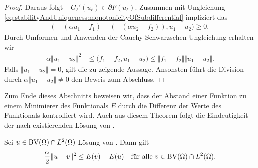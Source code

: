 \begin{proof}
  Daraus folgt
  $-G_\ell'(u_\ell)\in\partial F(u_\ell)$.
  Zusammen mit Ungleichung
  \eqref{eq:stabilityAndUniqueness:monotonicityOfSubdifferential}
  impliziert das
  \begin{align*}
    \big( -(\alpha u_1 - f_1) -(- (\alpha u_2 - f_2)), u_1 - u_2\big)
    \geq 0.
  \end{align*}
  Durch Umformen und Anwenden der Cauchy-Schwarzschen Ungleichung erhalten wir
  \begin{align*}
    \alpha \Vert u_1 - u_2 \Vert^2
    &\leq
    \big(f_1 -f_2, u_1-u_2 \big)
    \leq
    \Vert f_1-f_2\Vert\Vert u_1 - u_2\Vert.
  \end{align*}
  Falls $\Vert u_1 - u_2 \Vert = 0$, gilt die zu zeigende Aussage.
  Ansonsten führt die Division durch $\alpha\Vert u_1 - u_2 \Vert\neq 0$ den
  Beweis zum Abschluss.
\end{proof}

Zum Ende dieses Abschnitts beweisen wir, dass der Abstand einer Funktion
zu einem Minimierer des Funktionals $E$ durch die Differenz der Werte des
Funktionals kontrolliert wird.
Auch aus diesem Theorem folgt die Eindeutigkeit der nach
 existierenden Lösung von
.

\begin{theorem}
  \label{thm:convexity}
  Sei $u\in\textup{BV}(\Omega)\cap L^2(\Omega)$ Lösung von 
  .
  Dann gilt 
  \begin{align*}
    \frac{\alpha}{2}\Vert u-v\Vert^2 \leq E(v)-E(u)\quad
    \text{für alle } v\in\textup{BV}(\Omega)\cap L^2(\Omega).
  \end{align*}
\end{theorem}

